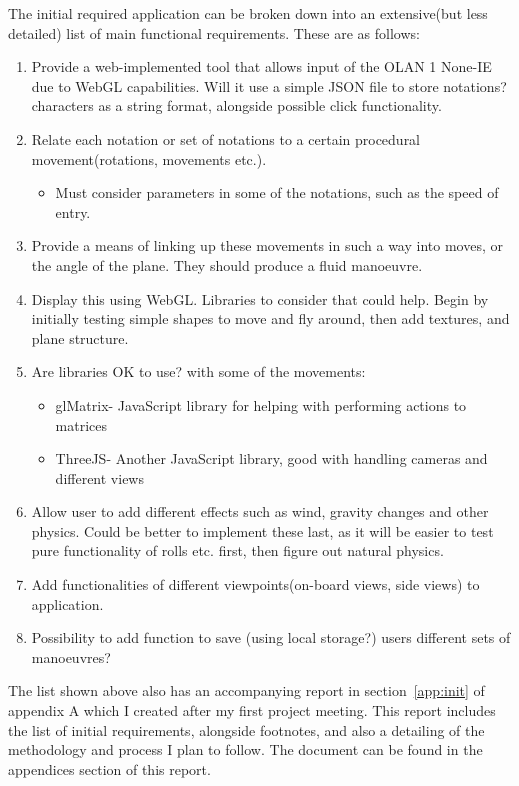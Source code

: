 \noindent The initial required application can be broken down into an extensive(but less detailed) list of main functional requirements. These are as follows:
\begin{enumerate}
	\item Provide a web-implemented tool that allows input of the OLAN 1 None-IE due to WebGL capabilities. Will it use a simple JSON file to store notations? characters as a string format, alongside possible click functionality.
	\item Relate each notation or set of notations to a certain procedural movement(rotations, movements etc.). 
		\begin{itemize}
			\item Must consider parameters in some of the notations, such as the speed of entry.
		\end{itemize}
	\item Provide a means of linking up these movements in such a way into moves, or the angle of the plane. They should produce a fluid manoeuvre.
	\item Display this using WebGL. Libraries to consider that could help. Begin by initially testing simple shapes to move and fly around, then add textures, and plane structure.
	\item Are libraries OK to use? with some of the movements:
		\begin{itemize}
			\item glMatrix- JavaScript library for helping with performing actions to matrices\cite{GlMatrix}
			\item ThreeJS- Another JavaScript library, good with handling cameras and different views\cite{ThreeJs}
		\end{itemize}
	\item Allow user to add different effects such as wind, gravity changes and other physics. Could be better to implement these last, as it will be easier to test pure functionality of rolls etc. first, then figure out natural physics.
	\item Add functionalities of different viewpoints(on-board views, side views) to application.
	\item Possibility to add function to save (using local storage?) users different sets of manoeuvres?
\end{enumerate}

The list shown above also has an accompanying report in section~\ref{app:init} of appendix A which I created after my first project meeting. This report includes the list of initial requirements, alongside footnotes, and also a detailing of the methodology and process I plan to follow. The document can be found in the appendices section of this report. 

